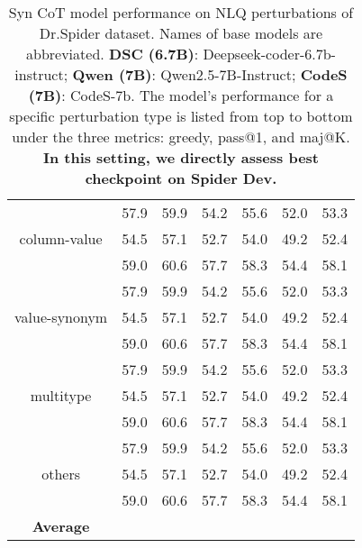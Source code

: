 \begin{table*}[t!]
\begin{adjustbox}{max width=\textwidth}
\begin{tabular}{c | c c | c c | c c }
        \multirow{3}{*}{column-value} & 57.9	& 59.9	& 54.2	&55.6	&52.0	&53.3 \\     
        &54.5	&57.1	&52.7	&54.0	&49.2	&52.4 \\
        &59.0	&60.6	&57.7	&58.3	&54.4	&58.1 \\ \midrule

        \multirow{3}{*}{value-synonym} & 57.9	& 59.9	& 54.2	&55.6	&52.0	&53.3 \\     
        &54.5	&57.1	&52.7	&54.0	&49.2	&52.4 \\
        &59.0	&60.6	&57.7	&58.3	&54.4	&58.1 \\ \midrule

        \multirow{3}{*}{multitype} & 57.9	& 59.9	& 54.2	&55.6	&52.0	&53.3 \\     
        &54.5	&57.1	&52.7	&54.0	&49.2	&52.4 \\
        &59.0	&60.6	&57.7	&58.3	&54.4	&58.1 \\ \midrule
        
        \multirow{3}{*}{others} & 57.9	& 59.9	& 54.2	&55.6	&52.0	&53.3 \\     
        &54.5	&57.1	&52.7	&54.0	&49.2	&52.4 \\
        &59.0	&60.6	&57.7	&58.3	&54.4	&58.1 \\ \midrule

        \multirow{3}{*}{\textbf{Average}} & & & & & & \\
        & & & & & & \\ 
        & & & & & & \\ 
        
        \bottomrule
    \end{tabular}
\end{adjustbox}
    \caption{Syn CoT model performance on NLQ perturbations of Dr.Spider dataset. Names of base models are abbreviated. \textbf{DSC (6.7B)}: Deepseek-coder-6.7b-instruct; \textbf{Qwen (7B)}: Qwen2.5-7B-Instruct; \textbf{CodeS (7B)}: CodeS-7b. The model's performance for a specific perturbation type is listed from top to bottom under the three metrics: greedy, pass@1, and maj@K. \textbf{In this setting, we directly assess best checkpoint on Spider Dev.}} 
\end{table*} 
\fi

